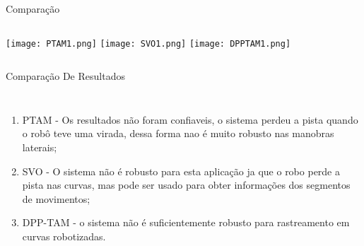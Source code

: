 \begin{frame}[t]{Comparação}
    \transboxout[duration=0.5]
    \begin{columns}
            \texttt{[image: PTAM1.png]}
            \texttt{[image: SVO1.png]}
            \texttt{[image: DPPTAM1.png]}
        
    \end{columns}
\end{frame}
\begin{frame}[t]{Comparação De Resultados}
    \transboxout[duration=0.5]
    \begin{columns}
            \begin{enumerate}
                \item PTAM - Os resultados não foram confiaveis, o sistema perdeu a pista quando o robô teve uma virada, dessa forma nao é muito robusto nas manobras laterais;
                \item SVO - O sistema não é robusto para esta aplicação ja que o robo perde a pista nas curvas, mas pode ser usado para obter informações dos segmentos de movimentos; 
                \item DPP-TAM - o sistema não é suficientemente robusto para rastreamento em curvas robotizadas. 
            \end{enumerate}
    \end{columns}
\end{frame}

